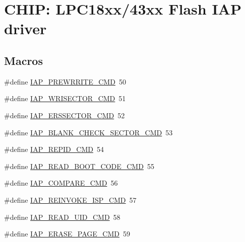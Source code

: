 \hypertarget{group___i_a_p__18_x_x__43_x_x}{}\section{C\+H\+IP\+: L\+P\+C18xx/43xx Flash I\+AP driver}
\label{group___i_a_p__18_x_x__43_x_x}
\subsection*{Macros}
\begin{DoxyCompactItemize}
\item 
\#define \hyperlink{group___i_a_p__18_x_x__43_x_x_ga540234bb0f525a06770175699d01063b}{I\+A\+P\+\_\+\+P\+R\+E\+W\+R\+R\+I\+T\+E\+\_\+\+C\+MD}~50
\item 
\#define \hyperlink{group___i_a_p__18_x_x__43_x_x_ga9eb15375e6dd4de560a7d43b4483a293}{I\+A\+P\+\_\+\+W\+R\+I\+S\+E\+C\+T\+O\+R\+\_\+\+C\+MD}~51
\item 
\#define \hyperlink{group___i_a_p__18_x_x__43_x_x_gad212cc38d91507366f07f9393e42eaec}{I\+A\+P\+\_\+\+E\+R\+S\+S\+E\+C\+T\+O\+R\+\_\+\+C\+MD}~52
\item 
\#define \hyperlink{group___i_a_p__18_x_x__43_x_x_ga2117bbba83cf2110a3fde4cafe189784}{I\+A\+P\+\_\+\+B\+L\+A\+N\+K\+\_\+\+C\+H\+E\+C\+K\+\_\+\+S\+E\+C\+T\+O\+R\+\_\+\+C\+MD}~53
\item 
\#define \hyperlink{group___i_a_p__18_x_x__43_x_x_gae385db2542e6b2c8b8417cf1b929fcb1}{I\+A\+P\+\_\+\+R\+E\+P\+I\+D\+\_\+\+C\+MD}~54
\item 
\#define \hyperlink{group___i_a_p__18_x_x__43_x_x_ga8d0f5e06feea423e15ee0238534f80ea}{I\+A\+P\+\_\+\+R\+E\+A\+D\+\_\+\+B\+O\+O\+T\+\_\+\+C\+O\+D\+E\+\_\+\+C\+MD}~55
\item 
\#define \hyperlink{group___i_a_p__18_x_x__43_x_x_gaa63a66d010441cd1b5837742455cf075}{I\+A\+P\+\_\+\+C\+O\+M\+P\+A\+R\+E\+\_\+\+C\+MD}~56
\item 
\#define \hyperlink{group___i_a_p__18_x_x__43_x_x_gad1f3638abcb5134b6fb6aceb67a4bb2c}{I\+A\+P\+\_\+\+R\+E\+I\+N\+V\+O\+K\+E\+\_\+\+I\+S\+P\+\_\+\+C\+MD}~57
\item 
\#define \hyperlink{group___i_a_p__18_x_x__43_x_x_gad2458645f1cf815f56f205bd7f7fd1af}{I\+A\+P\+\_\+\+R\+E\+A\+D\+\_\+\+U\+I\+D\+\_\+\+C\+MD}~58
\item 
\#define \hyperlink{group___i_a_p__18_x_x__43_x_x_ga24604c568e67c76aee924f9439426111}{I\+A\+P\+\_\+\+E\+R\+A\+S\+E\+\_\+\+P\+A\+G\+E\+\_\+\+C\+MD}~59

\end{DoxyCompactItemize}
